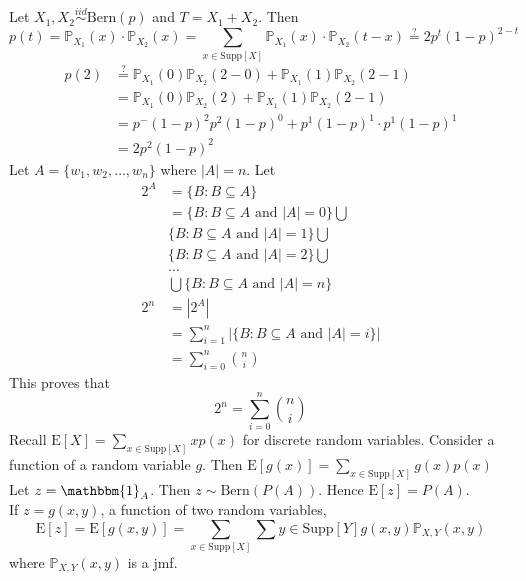 \documentclass[12pt]{article}
\newcommand{\probsub}[2]{\mathbb{P}_{#1}(#2)}
\newcommand{\indicator}[1]{\mathbbm{1}_{#1}}
\newcommand{\iid}{\stackrel{iid}{\sim}}
\newcommand{\suppx}{x \in \text{Supp}[X]}
\newcommand{\suppy}{y \in \text{Supp}[Y]}
\newcommand{\set}[1]{\Big\{ #1 \Big\}}
\newcommand{\expected}[1]{\mathrm{E}[#1]}
\begin{document}
Let $X_1, X_2 \iid \text{Bern}(p)$ and $T = X_1 + X_2$. Then 
$$ p(t)  = \probsub{X_1}{x} \cdot \probsub{X_2}{x} = \sum_{\suppx} \probsub{X_1}{x} \cdot \probsub{X_2}{t - x} \stackrel{?}{=} 2p^t(1 - p)^{2 - t}$$ 
$$\begin{aligned} p(2) &\stackrel{?}{=} \probsub{X_1}{0}\probsub{X_2}{2 - 0} + \probsub{X_1}{1}\probsub{X_2}{2 - 1} \\ &= \probsub{X_1}{0}\probsub{X_2}{2}+ \probsub{X_1}{1}\probsub{X_2}{2 - 1} \\ &= p^-(1 - p)^2p^2(1 - p)^0 + p^1(1 - p)^1\cdot p^1(1 - p)^1 \\ &= 2p^2(1 - p)^2 \end{aligned} $$ 
Let $ A = \set{w_1, w_2, \dots, w_n}$ 
where $|A| = n$. Let $$\begin{aligned} 2^A &= \set{B : B \subseteq A} \\ &= \set{B : B \subseteq A \text{ and } |A| = 0} \bigcup \\ &\set{B: B \subseteq A \text{ and } |A| = 1} \bigcup \\ &\set{B : B \subseteq A \text{ and } |A| = 2} \bigcup \\ &\hdots \\&\bigcup \set{B: B \subseteq A \text{ and } |A| = n} \\ 2^n &= |2^A| \\ &= \sum_{i = 1}^n | \set{B:B \subseteq A \text{ and } |A| = i} | \\ &= \sum_{i = 0}^n \binom{n}{i} \end{aligned} $$ This proves that $$2^n = \sum_{i = 0}^n \binom{n}{i}$$ 
Recall $\expected{X} = \sum_{\suppx} xp(x)$ for discrete random variables. Consider a function of a random variable $g$. Then $\expected{g(x)} = \sum_{\suppx} g(x)p(x)$ \\ 
Let $z = \indicator{A}$. Then $z \sim \text{Bern}(P(A))$. Hence $\expected{z} = P(A)$. \\
If $z = g(x, y)$, a function of two random variables, $$\expected{z} = \expected{g(x, y)} = \sum_{\suppx} \sum{\suppy} g(x, y) \probsub{X, Y}{x, y}$$ where $\probsub{X, Y}{x, y}$ is a jmf. \\
\end{document}

